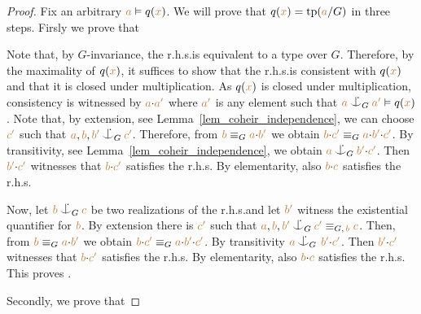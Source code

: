 \documentclass[creche.tex]{subfiles}
\begin{document}
\begin{proof}
Fix an arbitrary ${\color{brown} a}\vDash q({\color{brown} x})$.
We will prove that $q({\color{brown} x})={\rm tp}({\color{brown} a}/G)$ in three steps.
Firsly we prove that


Note that, by $G$-invariance, the r.h.s.\@ is equivalent to a type over $G$.
Therefore, by the maximality of $q({\color{brown} x})$, it suffices to show that the r.h.s.\@ is consistent with $q({\color{brown} x})$ and that it is closed under multiplication.
As $q({\color{brown} x})$ is closed under multiplication, consistency is witnessed by ${\color{brown} a}{\cdot}{\color{brown} a'}$ where ${\color{brown} a'}$ is any element such that ${\mr a}\nonforkc_G{\mr a'}\models q({\mr x})$.
%
Note that, by extension, see Lemma~\ref{lem_coheir_independence}, we can choose ${\color{brown} c'}$ such that ${\mr a},{\mr b},{\mr b'}\nonforkc_G{\mr c'}$.
Therefore, from ${\color{brown} b}\equiv_G{\color{brown} a}{\cdot}{\color{brown} b'}$ we obtain  ${\color{brown} b}{\cdot}{\color{brown} c'}\equiv_G{\color{brown} a}{\cdot}{\color{brown} b'}{\cdot}{\color{brown} c'}$.
By transitivity, see Lemma~\ref{lem_coheir_independence}, we obtain ${\mr a}\nonforkc_G{\mr b'}{\cdot}{\mr c'}$.
Then ${\color{brown} b'}{\cdot}{\color{brown} c'}$ witnesses that ${\color{brown} b}{\cdot}{\color{brown} c'}$ satisfies the r.h.s.
By elementarity, also ${\color{brown} b}{\cdot}{\color{brown} c}$  satisfies the r.h.s.

Now, let ${\mr b}\nonforkc_G{\mr c}$ be two realizations of the r.h.s.\@ and let ${\color{brown} b'}$ witness the existential quantifier for ${\color{brown} b}$.
By extension there is ${\color{brown} c'}$ such that ${\mr a}, {\mr b}, {\mr b'}\nonforkc_G{\mr c'}\equiv_{G,\,{\mr b}}{\mr c}$.
Then, from ${\color{brown} b}\equiv_G{\color{brown} a}{\cdot}{\color{brown} b'}$ we obtain  ${\color{brown} b}{\cdot}{\color{brown} c'}\equiv_G{\color{brown} a}{\cdot}{\color{brown} b'}{\cdot}{\color{brown} c'}$.
By transitivity ${\mr a}\nonforkc_G\,{\mr b'}{\cdot}{\mr c'}$.
Then ${\color{brown} b'}{\cdot}{\color{brown} c'}$ witnesses that ${\color{brown} b}{\cdot}{\color{brown} c'}$ satisfies the r.h.s.
By elementarity, also ${\color{brown} b}{\cdot}{\color{brown} c}$  satisfies the r.h.s.
This proves .


Secondly, we prove that 



\end{proof}
\end{document}
